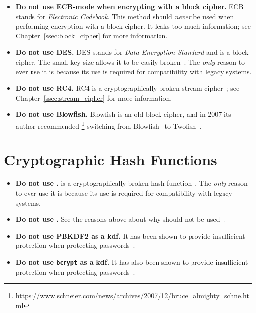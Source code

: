 \begin{itemize}
\item \textbf{Do not use ECB-mode when encrypting with a \gls{block cipher}.}
    ECB stands for \emph{Electronic Codebook}.
    This method should \emph{never} be used when performing
    encryption with a \gls{block cipher}.
    It leaks too much information; see Chapter~\ref{ssec:block_cipher}
    for more information.
\item \textbf{Do not use DES.}
    DES stands for \emph{Data Encryption Standard} and is a \gls{block cipher}.
    The small key size allows it to be easily broken~\cite{rfc4772}.
    The \emph{only} reason to ever use it is because its use is required
    for compatibility with legacy systems.
\item \textbf{Do not use RC4.}
    RC4 is a cryptographically-broken \gls{stream cipher}~\cite{rfc7465};
    see Chapter~\ref{ssec:stream_cipher} for more information.
\item \textbf{Do not use Blowfish.}
    Blowfish is an old \gls{block cipher},
    and in 2007 its author recommended%
    \footnote{\url{https://www.schneier.com/news/archives/2007/12/bruce_almighty_schne.html}}
    switching from Blowfish~\cite{BlowfishAlg} to Twofish~\cite{TwofishAlg}.
\end{itemize}

\section{Cryptographic Hash Functions}

\begin{itemize}
\item \textbf{Do not use \MDFive{}.}
    \MDFive{} is a cryptographically-broken \gls{hash function}~\cite{rfc6151}.
    The \emph{only} reason to ever use it is because its use is required
        for compatibility with legacy systems.
\item \textbf{Do not use \ShaOne{}.}
    See the reasons above about why \MDFive{} should not be used~\cite{rfc6194}.
\item \textbf{Do not use PBKDF2 as a \gls{kdf}.}
    It has been shown to provide insufficient protection
    when protecting passwords~\cite{blocki2018economics}.
\item \textbf{Do not use \texttt{bcrypt} as a \gls{kdf}.}
    It has also been shown to provide insufficient protection
    when protecting passwords~\cite{blocki2018economics}.
\end{itemize}


